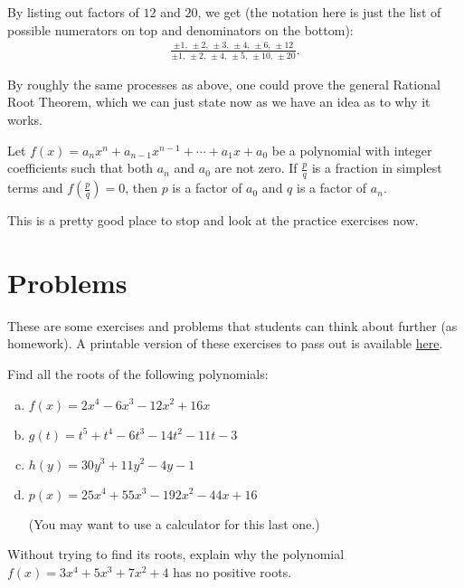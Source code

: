 By listing out factors of $12$ and $20$, we get (the notation here is just the list of possible numerators on top and denominators on the bottom):
\begin{align*}
    \frac{\pm 1,\, \pm 2,\, \pm 3,\, \pm 4,\, \pm 6,\, \pm 12}{\pm 1,\, \pm 2,\, \pm 4,\, \pm 5,\, \pm 10,\, \pm 20}.
\end{align*}

By roughly the same processes as above, one could prove the general Rational Root Theorem, which we can just state now as we have an idea as to why it works.
\begin{theorem}
    Let $f(x) = a_n x^n + a_{n-1} x^{n-1} + \cdots + a_1 x + a_0$ be a polynomial with integer coefficients such that both $a_n$ and $a_0$ are not zero. If $\frac{p}{q}$ is a fraction in simplest terms and $f\left(\frac{p}{q}\right) = 0$, then $p$ is a factor of $a_0$ and $q$ is a factor of $a_n$.
\end{theorem}

This is a pretty good place to stop and look at the practice exercises now.

\newpage



\section{Problems}

These are some exercises and problems that students can think about further (as homework). A printable version of these exercises to pass out is available \href{INSERT LINK HERE}{here}.

\begin{exercise}
    Find all the roots of the following polynomials:
    \begin{enumerate}[(a)]
        \item $f(x) = 2x^4-6x^3-12x^2+16x$
        \item $g(t) = t^5+t^4-6t^3-14t^2-11t-3$
        \item $h(y) = 30y^3+11y^2-4y-1$
        \item $p(x) = 25x^4+55x^3-192x^2-44x+16$ 
        
        (You may want to use a calculator for this last one.)
    \end{enumerate}
\end{exercise}

\begin{exercise}
    Without trying to find its roots, explain why the polynomial $f(x) = 3x^4 + 5x^3 + 7x^2 + 4$ has no positive roots.
\end{exercise}


